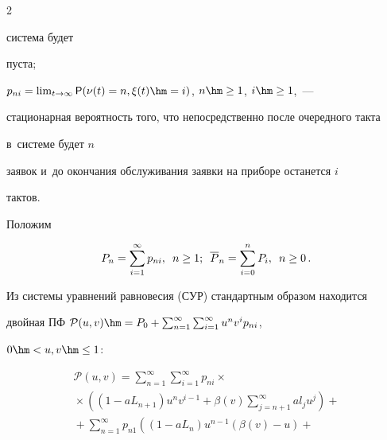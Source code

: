 \begin{multicols}{2}
\begin{description}
система будет


пуста;


\item[\,]


$p_{ni}=\lim\nolimits_{t \rightarrow \infty } {\sf P} (\nu(t)=n, 


\xi(t)\hm=i)$, $n \hm\ge 1$, $i \hm\ge 1$,~---


стационарная вероятность того, что непосредственно после очередного такта 


в~системе будет $n$


заявок и~до окончания обслуживания заявки на приборе останется $i$ 


тактов.


\end{description}





Положим


$$


P_n=\sum\limits_{i=1}^\infty p_{ni}, \enskip n \ge 1; \enskip {\overline 


P}_n=\sum\limits_{i=0}^n P_{i}, \enskip


 n \ge 0\,.


$$





Из системы уравнений равновесия (СУР) стандартным образом находится


двойная ПФ $\mathcal{P}(u,v)\hm=P_0+\sum\nolimits_{n=1}^\infty 


\sum\nolimits_{i=1}^\infty u^n v^i p_{ni}$,


$0\hm<u,v\hm\le 1$:


\begin{multline*}




\mathcal{P}(u,v)=


\sum\limits_{n=1}^\infty \sum\limits_{i=1}^\infty p_{ni}\times{}\\


{}\times


\left( (1-aL_{n+1}) u^n v^{i-1} + \beta(v) \sum\limits_{j=n+1}^\infty a 


l_j u^j \right)+{}\\


{}+\sum\limits_{n=1}^\infty p_{n1}


\left( (1-aL_{n}) u^{n-1} \left(\beta(v)-u \right) +{}\right.\\



\end{multline*}
\end{multicols}
